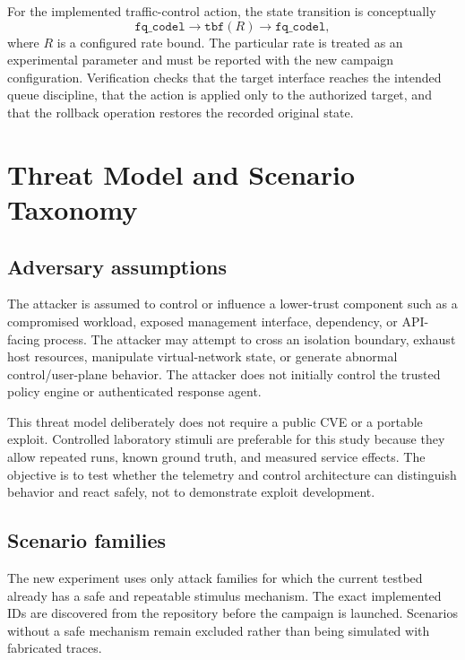 \documentclass[sigconf,review]{acmart}
\begin{document}
For the implemented traffic-control action, the state transition is conceptually
\begin{equation}
\texttt{fq\_codel} \rightarrow \texttt{tbf}(R) \rightarrow \texttt{fq\_codel},
\end{equation}
where $R$ is a configured rate bound. The particular rate is treated as an experimental parameter and must be reported with the new campaign configuration. Verification checks that the target interface reaches the intended queue discipline, that the action is applied only to the authorized target, and that the rollback operation restores the recorded original state.

\section{Threat Model and Scenario Taxonomy}
\subsection{Adversary assumptions}
The attacker is assumed to control or influence a lower-trust component such as a compromised workload, exposed management interface, dependency, or API-facing process. The attacker may attempt to cross an isolation boundary, exhaust host resources, manipulate virtual-network state, or generate abnormal control/user-plane behavior. The attacker does not initially control the trusted policy engine or authenticated response agent.

This threat model deliberately does not require a public CVE or a portable exploit. Controlled laboratory stimuli are preferable for this study because they allow repeated runs, known ground truth, and measured service effects. The objective is to test whether the telemetry and control architecture can distinguish behavior and react safely, not to demonstrate exploit development.

\subsection{Scenario families}
The new experiment uses only attack families for which the current testbed already has a safe and repeatable stimulus mechanism. The exact implemented IDs are discovered from the repository before the campaign is launched. Scenarios without a safe mechanism remain excluded rather than being simulated with fabricated traces.
\end{document}
